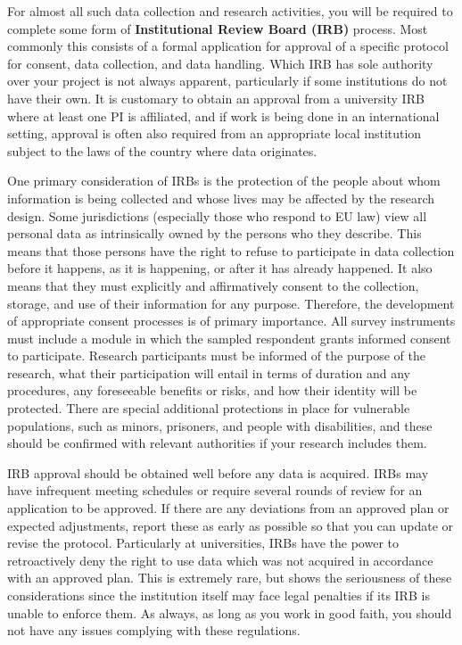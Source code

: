 For almost all such data collection and research activities,
you will be required to complete some form of \textbf{Institutional Review Board (IRB)} process.
Most commonly this consists of a formal application for approval of a specific
protocol for consent, data collection, and data handling.
Which IRB has sole authority over your project is not always apparent,
particularly if some institutions do not have their own.
It is customary to obtain an approval from a university IRB
where at least one PI is affiliated,
and if work is being done in an international setting,
approval is often also required
from an appropriate local institution subject to the laws of the country where data originates.

One primary consideration of IRBs
is the protection of the people about whom information is being collected
and whose lives may be affected by the research design.
Some jurisdictions (especially those who respond to EU law) view all personal data
as intrinsically owned by the persons who they describe.
This means that those persons have the right to refuse to participate in data collection
before it happens, as it is happening, or after it has already happened.
It also means that they must explicitly and affirmatively consent
to the collection, storage, and use of their information for any purpose.
Therefore, the development of appropriate consent processes is of primary importance.
All survey instruments must include a module in which the sampled respondent grants informed consent to participate.
Research participants must be informed of the purpose of the research,
what their participation will entail in terms of duration and any procedures,
any foreseeable benefits or risks,
and how their identity will be protected.
There are special additional protections in place for vulnerable populations,
such as minors, prisoners, and people with disabilities,
and these should be confirmed with relevant authorities if your research includes them.

IRB approval should be obtained well before any data is acquired.
IRBs may have infrequent meeting schedules
or require several rounds of review for an application to be approved.
If there are any deviations from an approved plan or expected adjustments,
report these as early as possible so that you can update or revise the protocol.
Particularly at universities, IRBs have the power to retroactively deny
the right to use data which was not acquired in accordance with an approved plan.
This is extremely rare, but shows the seriousness of these considerations
since the institution itself may face legal penalties if its IRB
is unable to enforce them. As always, as long as you work in good faith,
you should not have any issues complying with these regulations.

